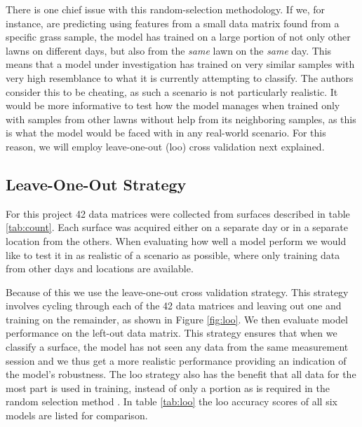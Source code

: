 There is one chief issue with this random-selection methodology. If we, for instance, are predicting using features from a small data matrix found from a specific grass sample, the model has trained on a large portion of not only other lawns on different days, but also from the \emph{same} lawn on the \emph{same} day. This means that a model under investigation has trained on very similar samples with very high resemblance to what it is currently attempting to classify. The authors consider this to be cheating, as such a scenario is not particularly realistic. It would be more informative to test how the model manages when trained only with samples from other lawns without help from its neighboring samples, as this is what the model would be faced with in any real-world scenario. For this reason, we will employ leave-one-out (\gls{loo}) cross validation next explained. 





\subsection{Leave-One-Out Strategy}


For this project 42 data matrices were collected from surfaces described in table \ref{tab:count}. Each surface was acquired either on a separate day or in a separate location from the others. When evaluating how well a model perform we would like to test it in as realistic of a scenario as possible, where only training data from other days and locations are available. 

Because of this we use the leave-one-out cross validation strategy. This strategy involves cycling through each of the 42 data matrices and leaving out one and training on the remainder, as shown in Figure \ref{fig:loo}. We then evaluate model performance on the left-out data matrix. This strategy ensures that when we classify a surface, the model has not seen any data from the same measurement session and we thus get a more realistic performance providing an indication of the model's robustness. The \gls{loo} strategy also has the benefit that all data for the most part is used in training, instead of only a portion as is required in the random selection method \citep{raschka}. In table \ref{tab:loo} the \gls{loo} accuracy scores of all six models are listed for comparison. 

